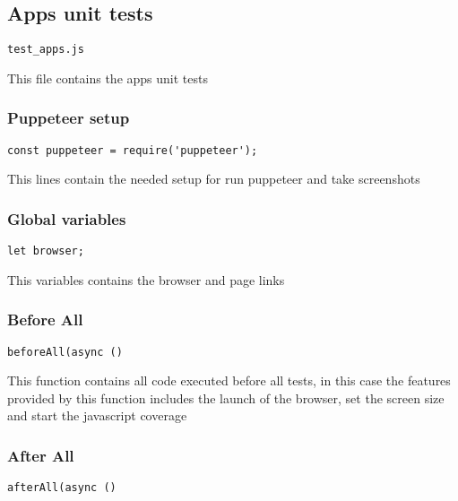 \documentclass[a4paper]{article}
\begin{document}
\subsection{Apps unit tests}

\begin{lstlisting}
test_apps.js
\end{lstlisting}

This file contains the apps unit tests

\hypertarget{toc456}{}
\subsubsection{Puppeteer setup}

\begin{lstlisting}
const puppeteer = require('puppeteer');
\end{lstlisting}

This lines contain the needed setup for run puppeteer and take screenshots

\hypertarget{toc457}{}
\subsubsection{Global variables}

\begin{lstlisting}
let browser;
\end{lstlisting}

This variables contains the browser and page links

\hypertarget{toc458}{}
\subsubsection{Before All}

\begin{lstlisting}
beforeAll(async ()
\end{lstlisting}

This function contains all code executed before all tests, in this case the
features provided by this function includes the launch of the browser, set
the screen size and start the javascript coverage

\hypertarget{toc459}{}
\subsubsection{After All}

\begin{lstlisting}
afterAll(async ()
\end{lstlisting}
\end{document}
